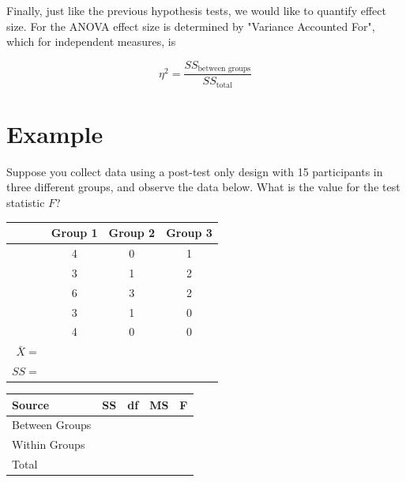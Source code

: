 \documentclass{tufte-handout}
\begin{document}
Finally, just like the previous hypothesis tests, we would like to quantify effect size. For the ANOVA effect size is determined by "Variance Accounted For", which for independent measures, is 

\begin{equation*}
\eta^2 = \frac{SS_{\text{between groups}}}{SS_{\text{total}}}
\end{equation*}

\pagebreak
\section{Example}

\begin{fullwidth}
Suppose you collect data using a post-test only design with 15 participants in three different groups, and observe the data below. What is the value for the test statistic $F$?

\begin{table}
  \centering
  \selectfont
  \begin{tabular}{rccc}
    \toprule
    & Group 1 & Group 2 & Group 3\\
    \midrule
&4&	0&	1\\
&3&	1&	2\\
&6&	3&	2\\
&3&	1&	0\\
&4&	0&	0\\
\midrule
$\bar{X}=$&&&\\
$SS=$&&&\\
    \bottomrule
  \end{tabular}
  \label{tab:normaltab}
\end{table}

\vspace{4.5 in}

\begin{table}
  \centering
  \selectfont
  \begin{tabular}{lllll}
    \toprule
    Source & \qquad SS & \qquad df & \qquad MS & \qquad F \\
    \midrule
    Between Groups & & & & \\
    Within Groups & & & & \\
    Total & & & & \\
    \bottomrule
  \end{tabular}
  \label{tab:normaltab}
\end{table}
\end{fullwidth}
\end{document}
